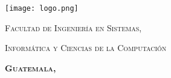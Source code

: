 \documentclass[
12pt, %
spanish, %
doublespacing, %
liststotoc, %
parskip, %
headsepline, %
table,
]{MastersDoctoralThesis} %
\author{José Jacobo \textsc{Del Valle Girón}} %
\begin{document}
\frontmatter %

\pagestyle{plain} %


\begin{titlepage}
\begin{center}

\begingroup\onehalfspacing

{\scshape\LARGE \authorname\par}\vspace{1.5cm} %

{\huge \bfseries \ttitle\par} %

\vspace{1.5cm}

\texttt{[image: logo.png]} %

\vspace{1.5cm}

{\scshape\Large \univname\par} %
{\scshape\Large Facultad de Ingeniería en Sistemas,}
{\scshape\Large Informática y Ciencias de la Computación\par}

{\scshape \Large \bfseries Guatemala, \the\year \par}

\endgroup
 
\vfill
\end{center}
\end{titlepage}

\end{document}
